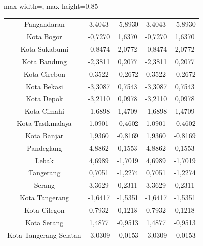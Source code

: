 \begin{table}[H]
\begin{adjustbox}{max width=\textwidth, max height=0.85\textheight}
\begin{tabular}{|c|c|c|c|c|}
Pangandaran & 3,4043 & -5,8930 & 3,4043 & -5,8930 \\
Kota Bogor & -0,7270 & 1,6370 & -0,7270 & 1,6370 \\
Kota Sukabumi & -0,8474 & 2,0772 & -0,8474 & 2,0772 \\
Kota Bandung & -2,3811 & 0,2077 & -2,3811 & 0,2077 \\
Kota Cirebon & 0,3522 & -0,2672 & 0,3522 & -0,2672 \\
Kota Bekasi & -3,3087 & 0,7543 & -3,3087 & 0,7543 \\
Kota Depok & -3,2110 & 0,0978 & -3,2110 & 0,0978 \\
Kota Cimahi & -1,6898 & 1,4709 & -1,6898 & 1,4709 \\
Kota Tasikmalaya & 1,0901 & -0,4602 & 1,0901 & -0,4602 \\
Kota Banjar & 1,9360 & -0,8169 & 1,9360 & -0,8169 \\
Pandeglang & 4,8862 & 0,1553 & 4,8862 & 0,1553 \\
Lebak & 4,6989 & -1,7019 & 4,6989 & -1,7019 \\
Tangerang & 0,7051 & -1,2274 & 0,7051 & -1,2274 \\
Serang & 3,3629 & 0,2311 & 3,3629 & 0,2311 \\
Kota Tangerang & -1,6417 & -1,5351 & -1,6417 & -1,5351 \\
Kota Cilegon & 0,7932 & 0,1218 & 0,7932 & 0,1218 \\
Kota Serang & 1,4877 & -0,9513 & 1,4877 & -0,9513 \\
Kota Tangerang Selatan & -3,0309 & -0,0153 & -3,0309 & -0,0153 \\
\hline
\end{tabular}
\end{adjustbox}
\end{table}